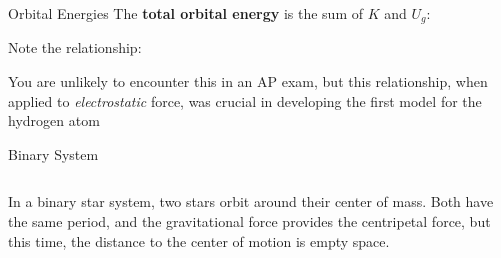 \documentclass[12pt,compress,aspectratio=169]{beamer}
\begin{document}
\begin{frame}{Orbital Energies}
  \vspace{-.1in}The \textbf{total orbital energy} is the sum of $K$ and $U_g$:


  Note the relationship:


  You are unlikely to encounter this in an AP exam, but this relationship, when
  applied to \emph{electrostatic} force, was crucial in developing the first
  model for the hydrogen atom
\end{frame}



\begin{frame}{Binary System}
  \begin{columns}

    In a binary star system, two stars orbit around their center of mass. Both
    have the same period, and the gravitational force provides the centripetal
    force, but this time, the distance to the center of motion is empty space.
  \end{columns}
\end{frame}
\end{document}
